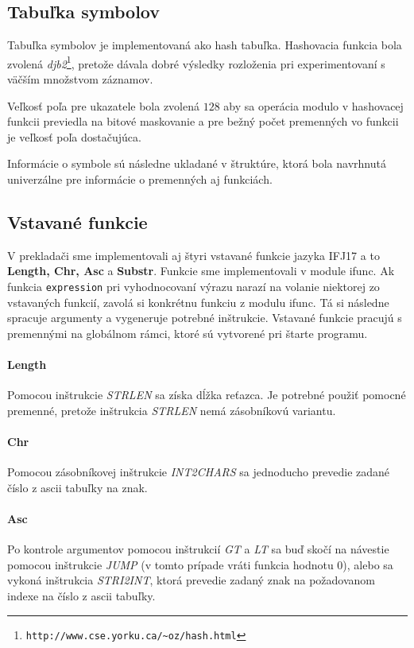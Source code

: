 \documentclass{article}
\begin{document}
        \subsection{Tabuľka symbolov}
            Tabuľka symbolov je implementovaná ako hash tabuľka. Hashovacia funkcia bola zvolená \emph{djb2}\footnote{\texttt{http://www.cse.yorku.ca/\~{}oz/hash.html}}, pretože dávala dobré výsledky rozloženia pri experimentovaní s väčším množstvom záznamov.
            
            Veľkosť poľa pre ukazatele bola zvolená $128$ aby sa operácia modulo v hashovacej funkcii previedla na bitové maskovanie a pre bežný počet premenných vo funkcii je veľkosť poľa dostačujúca.
            
            Informácie o symbole sú následne ukladané v štruktúre, ktorá bola navrhnutá univerzálne pre informácie o premenných aj funkciách.
        
        \subsection{Vstavané funkcie}
            V prekladači sme implementovali aj štyri vstavané funkcie jazyka IFJ17 a to \textbf{Length, Chr, Asc} a \textbf{Substr}.
            Funkcie sme implementovali v module ifunc. Ak funkcia \texttt{expression} pri vyhodnocovaní výrazu narazí na volanie 
            niektorej zo vstavaných funkcií, zavolá si konkrétnu funkciu z modulu ifunc. Tá si následne spracuje argumenty a 
            vygeneruje potrebné inštrukcie. Vstavané funkcie pracujú s premennými na globálnom rámci, ktoré sú vytvorené pri štarte programu.

            \paragraph{Length}
            Pomocou inštrukcie \emph{STRLEN} sa získa dĺžka reťazca. Je potrebné použiť pomocné premenné, pretože 
            inštrukcia \emph{STRLEN} nemá zásobníkovú variantu.

            \paragraph{Chr}
            Pomocou zásobníkovej inštrukcie \emph{INT2CHARS} sa jednoducho prevedie zadané číslo z ascii tabuľky na znak.

            \paragraph{Asc}
            Po kontrole argumentov pomocou inštrukcií \emph{GT} a \emph{LT} sa buď skočí na návestie pomocou inštrukcie 
            \emph{JUMP} (v tomto prípade vráti funkcia hodnotu 0), alebo sa vykoná inštrukcia \emph{STRI2INT},
            ktorá prevedie zadaný znak na požadovanom indexe na číslo z ascii tabuľky.
\end{document}
